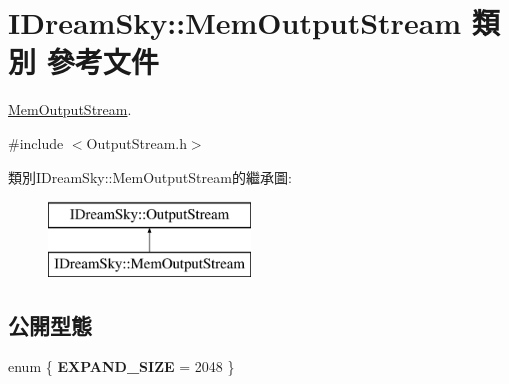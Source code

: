 \hypertarget{class_i_dream_sky_1_1_mem_output_stream}{}\section{I\+Dream\+Sky\+:\+:Mem\+Output\+Stream 類別 參考文件}
\label{class_i_dream_sky_1_1_mem_output_stream}


\hyperlink{class_i_dream_sky_1_1_mem_output_stream}{Mem\+Output\+Stream}.  




{\ttfamily \#include $<$Output\+Stream.\+h$>$}

類別\+I\+Dream\+Sky\+:\+:Mem\+Output\+Stream的繼承圖\+:\begin{figure}[H]
\begin{center}
\leavevmode
\includegraphics[height=2.000000cm]{class_i_dream_sky_1_1_mem_output_stream}
\end{center}
\end{figure}
\subsection*{公開型態}
\begin{DoxyCompactItemize}
\item 
enum \{ {\bfseries E\+X\+P\+A\+N\+D\+\_\+\+S\+I\+ZE} = 2048
 \}\hypertarget{class_i_dream_sky_1_1_mem_output_stream_a4f58a15f518ab79ff4ea10f7fd74340a}{}\label{class_i_dream_sky_1_1_mem_output_stream_a4f58a15f518ab79ff4ea10f7fd74340a}

\end{DoxyCompactItemize}
